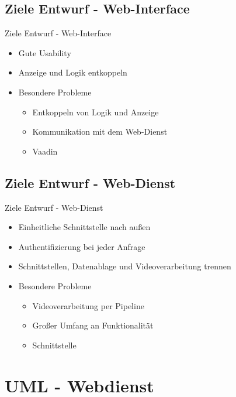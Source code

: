 \documentclass[19pt]{beamer}
\begin{document}
\subsection{Ziele Entwurf - Web-Interface}
\begin{frame}{Ziele Entwurf - Web-Interface}
    \begin{itemize}
		\item Gute Usability
		\item Anzeige und Logik entkoppeln
    	\item Besondere Probleme
    	\begin{itemize}
			\item Entkoppeln von Logik und Anzeige
			\item Kommunikation mit dem Web-Dienst
			\item Vaadin
		\end{itemize}
    \end{itemize}
\end{frame}

\subsection{Ziele Entwurf - Web-Dienst}
\begin{frame}{Ziele Entwurf - Web-Dienst}
	\begin{itemize}
		\item Einheitliche Schnittstelle nach außen
		\item Authentifizierung bei jeder Anfrage
		\item Schnittstellen, Datenablage und Videoverarbeitung trennen
		\item Besondere Probleme
		\begin{itemize}
			\item Videoverarbeitung per Pipeline
			\item Großer Umfang an Funktionalität
			\item Schnittstelle
		\end{itemize}
	\end{itemize}
\end{frame}


\section{UML - Webdienst}
\end{document}
